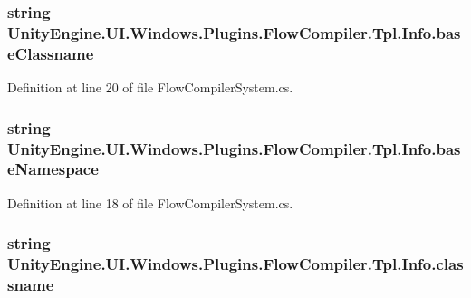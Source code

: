 \subsubsection[{base\+Classname}]{\setlength{\rightskip}{0pt plus 5cm}string Unity\+Engine.\+U\+I.\+Windows.\+Plugins.\+Flow\+Compiler.\+Tpl.\+Info.\+base\+Classname}\label{class_unity_engine_1_1_u_i_1_1_windows_1_1_plugins_1_1_flow_compiler_1_1_tpl_1_1_info_ae709ff8981409c3d168400e8acc92d69}


Definition at line 20 of file Flow\+Compiler\+System.\+cs.

\hypertarget{class_unity_engine_1_1_u_i_1_1_windows_1_1_plugins_1_1_flow_compiler_1_1_tpl_1_1_info_aa0bbcea5d54ea9162b99b571d448786f}{}
\subsubsection[{base\+Namespace}]{\setlength{\rightskip}{0pt plus 5cm}string Unity\+Engine.\+U\+I.\+Windows.\+Plugins.\+Flow\+Compiler.\+Tpl.\+Info.\+base\+Namespace}\label{class_unity_engine_1_1_u_i_1_1_windows_1_1_plugins_1_1_flow_compiler_1_1_tpl_1_1_info_aa0bbcea5d54ea9162b99b571d448786f}


Definition at line 18 of file Flow\+Compiler\+System.\+cs.

\hypertarget{class_unity_engine_1_1_u_i_1_1_windows_1_1_plugins_1_1_flow_compiler_1_1_tpl_1_1_info_a1ace9f54a19a40d1f0581a1c378e690b}{}
\subsubsection[{classname}]{\setlength{\rightskip}{0pt plus 5cm}string Unity\+Engine.\+U\+I.\+Windows.\+Plugins.\+Flow\+Compiler.\+Tpl.\+Info.\+classname}\label{class_unity_engine_1_1_u_i_1_1_windows_1_1_plugins_1_1_flow_compiler_1_1_tpl_1_1_info_a1ace9f54a19a40d1f0581a1c378e690b}


